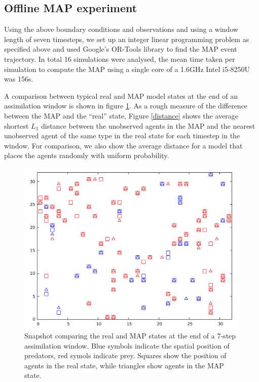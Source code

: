 \documentclass{article}
\begin{document}
\subsection{Offline MAP experiment}

Using the above boundary conditions and observations and using a window length of seven timesteps, we set up an integer linear programming problem as specified above and used Google's OR-Tools\cite{googleortools} library to find the MAP event trajectory. In total 16 simulations were analysed, the mean time taken per simulation to compute the MAP using a single core of a 1.6GHz Intel i5-8250U was 156s.

A comparison between typical real and MAP model states at the end of an assimilation window is shown in figure \ref{snapshot}. As a rough measure of the difference between the MAP and the ``real'' state, Figure \ref{distance} shows the average shortest $L_1$ distance between the unobserved agents in the MAP and the nearest unobserved agent of the same type in the real state for each timestep in the window. For comparison, we also show the average distance for a model that places the agents randomly with uniform probability.

\begin{figure}
\begin{center}
\includegraphics[width = 12cm]{snapshot7steps.pdf}
\end{center}
\caption{Snapshot comparing the real and MAP states at the end of a 7-step assimilation window. Blue symbols indicate the spatial position of predators, red symols indicate prey. Squares show the position of agents in the real state, while triangles show agents in the MAP state.}
\label{snapshot}
\end{figure}
\end{document}
